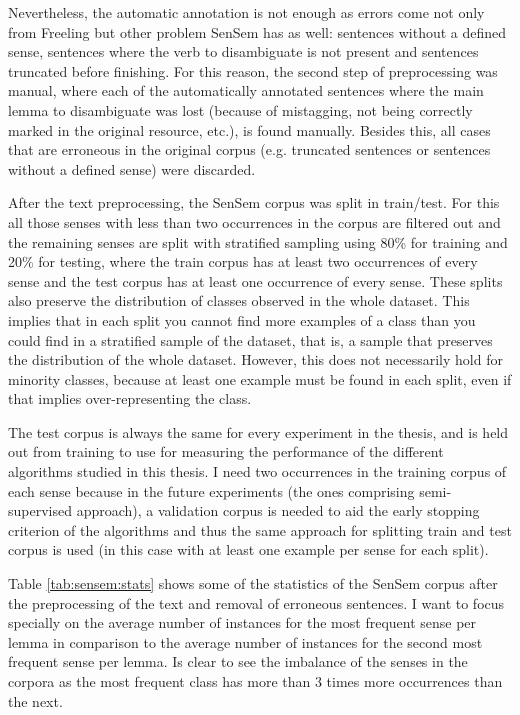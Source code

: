 Nevertheless, the automatic annotation is not enough as errors come not only
from Freeling but other problem SenSem has as well: sentences without a defined
sense, sentences where the verb to disambiguate is not present and sentences
truncated before finishing. For this reason, the second step of preprocessing
was manual, where each of the automatically annotated sentences where the main
lemma to disambiguate was lost (because of mistagging, not being correctly
marked in the original resource, etc.), is found manually. Besides this, all
cases that are erroneous in the original corpus (e.g. truncated sentences or
sentences without a defined sense) were discarded. 

After the text preprocessing, the SenSem corpus was split in train/test. For
this all those senses with less than two occurrences in the corpus are filtered
out and the remaining senses are split with stratified sampling using 80\%
for training and 20\% for testing, where the train corpus has at least two
occurrences of every sense and the test corpus has at least one occurrence of
every sense. These splits also preserve the distribution of classes observed in
the whole dataset. This implies that in each split you cannot find more
examples of a class than you could find in a stratified sample of the dataset,
that is, a sample that preserves the distribution of the whole dataset.
However, this does not necessarily hold for minority classes, because at least
one example must be found in each split, even if that implies over-representing
the class.

The test corpus is always the same for every experiment in the thesis, and is
held out from training to use for measuring the performance of the different
algorithms studied in this thesis. I need two occurrences in the training
corpus of each sense because in the future experiments (the ones comprising
semi-supervised approach), a validation corpus is needed to aid the early
stopping criterion of the algorithms and thus the same approach for splitting
train and test corpus is used (in this case with at least one example per sense
for each split).

Table \ref{tab:sensem:stats} shows some of the statistics of the SenSem corpus
after the preprocessing of the text and removal of erroneous sentences. I want
to focus specially on the average number of instances for the most frequent
sense per lemma in comparison to the average number of instances for the second
most frequent sense per lemma. Is clear to see the imbalance of the senses in
the corpora as the most frequent class has more than 3 times more occurrences
than the next.

